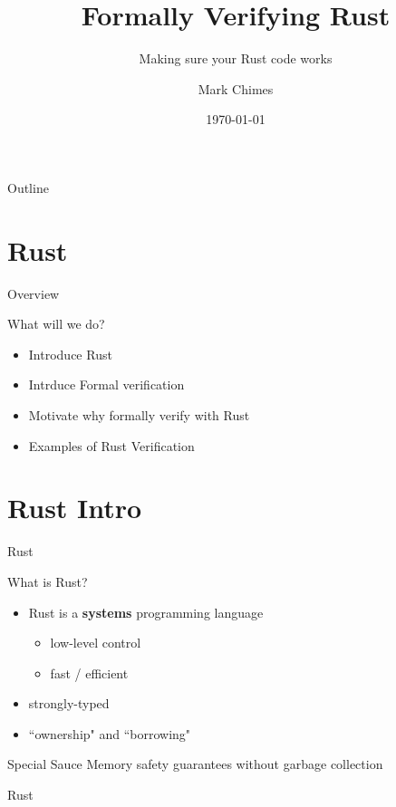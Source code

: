\documentclass{beamer}
\title{Formally Verifying Rust}
\subtitle{Making sure your Rust code works}
\author{Mark Chimes}
\date{\today}
\begin{document}
\begin{frame}
    \titlepage
\end{frame}

\begin{frame}{Outline}
\tableofcontents
\end{frame}

\section{Rust}
\begin{frame}{Overview}
\begin{block}{What will we do?}
\begin{itemize} 
	\item Introduce Rust
	\item Intrduce Formal verification
	\item Motivate why formally verify with Rust
	\item Examples of Rust Verification
\end{itemize}
\end{block}
\end{frame}


\section{Rust Intro}
\begin{frame}{Rust}
\begin{block}{What is Rust?}
\begin{itemize}
	\item Rust is a \textbf{systems} programming language
	\begin{itemize}
		\item low-level control
		\item fast / efficient
	\end{itemize}
	\item strongly-typed
	\item ``ownership" and ``borrowing"
\end{itemize}
\end{block}
\begin{block}{Special Sauce} 
Memory safety guarantees without garbage collection
\end{block}
\end{frame}

\begin{frame}{Rust}

\end{frame}
\end{document}
